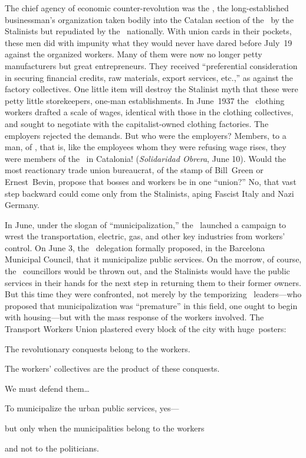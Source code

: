The chief agency of economic counter-revolution was the \GEPCI, the long-established businessman’s organization taken bodily into the Catalan section of the \UGT\ by the Stalinists but repudiated by the \UGT\ nationally. With union cards in their pockets, these men did with impunity what they would never have dared before July~19 against the organized workers. Many of them were now no longer petty manufacturers but great entrepreneurs. They received ``preferential consideration in securing financial credits, raw materials, export services, etc.,'' as against the factory collectives. One little item will destroy the Stalinist myth that these were petty little storekeepers, one-man establishments. In June~1937 the \UGT\ clothing workers drafted a scale of wages, identical with those in the clothing collectives, and sought to negotiate with the capitalist-owned clothing factories. The employers rejected the demands. But who were the employers? Members, to a man, of \GEPCI\indexGEPCI, that is, like the employees whom they were refusing wage rises, they were members of the \UGT\ in Catalonia! (\emph{Solidaridad Obrera}, June 10). Would the most reactionary trade union bureaucrat, of the stamp of Bill~Green or Ernest~Bevin, propose that bosses and workers be in one ``union?'' No, that vast step backward could come only from the Stalinists, aping Fascist Italy and Nazi Germany.

In June, under the slogan of ``municipalization,'' the \PSUC\ launch\-ed a campaign to wrest the transportation, electric, gas, and other key industries from workers’ control. On June 3, the \PSUC\ delegation formally proposed, in the Barcelona Municipal Council, that it municipalize public services. On the morrow, of course, the \CNT\ councillors would be thrown out, and the Stalinists would have the public services in their hands for the next step in returning them to their former owners. But this time they were confronted, not merely by the temporizing \CNT\ leaders---who proposed that municipalization was ``premature'' in this field, one ought to begin with housing---but with the mass response of the workers involved. The Transport Workers Union plastered every block of the city with huge~posters:

\medskip

\begin{oframed}
  \centering\sffamily
  \setlength{\parskip}{0.5\baselineskip}
  
  \medskip
  The revolutionary conquests belong to the workers.
  
  The workers’ collectives are the product of these conquests.
  
  We must defend them\dots
  
  To municipalize the urban public services, yes---
  
  but only when the municipalities belong to the workers
  
  and not to the politicians.
  \medskip
\end{oframed}

